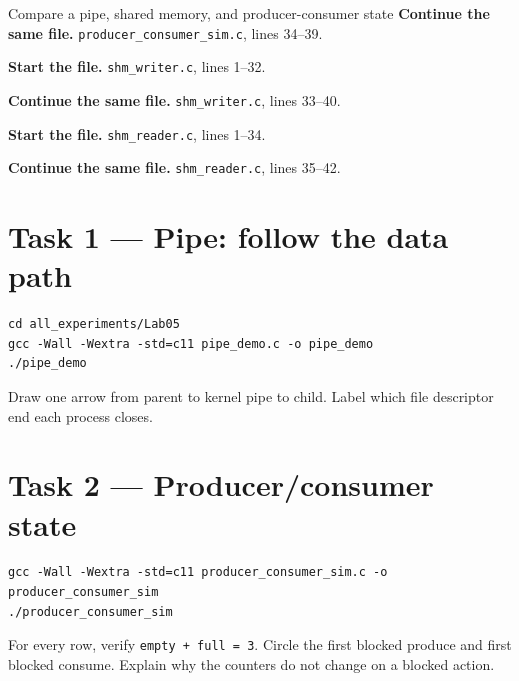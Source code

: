 \begin{labproject}{Compare a pipe, shared memory, and producer-consumer state}
\noindent\textbf{Continue the same file.} \texttt{producer\_consumer\_sim.c}, lines 34--39.


\noindent\textbf{Start the file.} \texttt{shm\_writer.c}, lines 1--32.


\noindent\textbf{Continue the same file.} \texttt{shm\_writer.c}, lines 33--40.


\noindent\textbf{Start the file.} \texttt{shm\_reader.c}, lines 1--34.


\noindent\textbf{Continue the same file.} \texttt{shm\_reader.c}, lines 35--42.


\section*{Task 1 --- Pipe: follow the data path}
\begin{lstlisting}[style=utpbash]
cd all_experiments/Lab05
gcc -Wall -Wextra -std=c11 pipe_demo.c -o pipe_demo
./pipe_demo
\end{lstlisting}
Draw one arrow from parent to kernel pipe to child. Label which file descriptor end each process closes.

\section*{Task 2 --- Producer/consumer state}
\begin{lstlisting}[style=utpbash]
gcc -Wall -Wextra -std=c11 producer_consumer_sim.c -o producer_consumer_sim
./producer_consumer_sim
\end{lstlisting}
For every row, verify \texttt{empty + full = 3}. Circle the first blocked produce and first blocked consume. Explain why the counters do not change on a blocked action.


\end{labproject}
